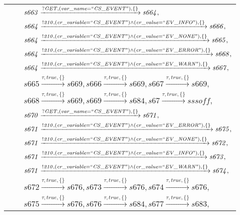 \begin{tabular}{lcp{350px}}
& & $\mathit{s663}\xrightarrow{\mathit{?GET}, \mathit{(var\_name = ``CS\_EVENT")}, \{\}}\mathit{s664},$ \\
& & $\mathit{s664}\xrightarrow{\mathit{!210}, \mathit{(cr\_variable = ``CS\_EVENT") \land (cr\_value = ``EV\_INFO")}, \{\}}\mathit{s666},$ \\
& & $\mathit{s664}\xrightarrow{\mathit{!210}, \mathit{(cr\_variable = ``CS\_EVENT") \land (cr\_value = ``EV\_NONE")}, \{\}}\mathit{s665},$ \\
& & $\mathit{s664}\xrightarrow{\mathit{!210}, \mathit{(cr\_variable = ``CS\_EVENT") \land (cr\_value = ``EV\_ERROR")}, \{\}}\mathit{s668},$ \\
& & $\mathit{s664}\xrightarrow{\mathit{!210}, \mathit{(cr\_variable = ``CS\_EVENT") \land (cr\_value = ``EV\_WARN")}, \{\}}\mathit{s667},$ \\
& & $\mathit{s665}\xrightarrow{\mathit{\tau}, \mathit{true}, \{\}}\mathit{s669},\mathit{s666}\xrightarrow{\mathit{\tau}, \mathit{true}, \{\}}\mathit{s669},\mathit{s667}\xrightarrow{\mathit{\tau}, \mathit{true}, \{\}}\mathit{s669},$ \\
& & $\mathit{s668}\xrightarrow{\mathit{\tau}, \mathit{true}, \{\}}\mathit{s669},\mathit{s669}\xrightarrow{\mathit{\tau}, \mathit{true}, \{\}}\mathit{s684},\mathit{s67}\xrightarrow{\mathit{\tau}, \mathit{true}, \{\}}\mathit{sssoff},$ \\
& & $\mathit{s670}\xrightarrow{\mathit{?GET}, \mathit{(var\_name = ``CS\_EVENT")}, \{\}}\mathit{s671},$ \\
& & $\mathit{s671}\xrightarrow{\mathit{!210}, \mathit{(cr\_variable = ``CS\_EVENT") \land (cr\_value = ``EV\_ERROR")}, \{\}}\mathit{s675},$ \\
& & $\mathit{s671}\xrightarrow{\mathit{!210}, \mathit{(cr\_variable = ``CS\_EVENT") \land (cr\_value = ``EV\_NONE")}, \{\}}\mathit{s672},$ \\
& & $\mathit{s671}\xrightarrow{\mathit{!210}, \mathit{(cr\_variable = ``CS\_EVENT") \land (cr\_value = ``EV\_INFO")}, \{\}}\mathit{s673},$ \\
& & $\mathit{s671}\xrightarrow{\mathit{!210}, \mathit{(cr\_variable = ``CS\_EVENT") \land (cr\_value = ``EV\_WARN")}, \{\}}\mathit{s674},$ \\
& & $\mathit{s672}\xrightarrow{\mathit{\tau}, \mathit{true}, \{\}}\mathit{s676},\mathit{s673}\xrightarrow{\mathit{\tau}, \mathit{true}, \{\}}\mathit{s676},\mathit{s674}\xrightarrow{\mathit{\tau}, \mathit{true}, \{\}}\mathit{s676},$ \\
& & $\mathit{s675}\xrightarrow{\mathit{\tau}, \mathit{true}, \{\}}\mathit{s676},\mathit{s676}\xrightarrow{\mathit{\tau}, \mathit{true}, \{\}}\mathit{s684},\mathit{s677}\xrightarrow{\mathit{\tau}, \mathit{true}, \{\}}\mathit{s683},$ \\

\end{tabular}
